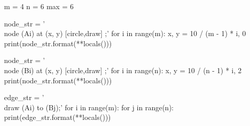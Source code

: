 \begin{python}
m = 4
n = 6
max = 6

node_str = '\\node (A{i}) at ({x}, {y}) [circle,draw] {{}};\n'
for i in range(m):
    x, y = 10 / (m -  1) * i, 0
    print(node_str.format(**locals()))

node_str = '\\node (B{i}) at ({x}, {y}) [circle,draw] {{}};\n'
for i in range(n):
    x, y = 10 / (n - 1) * i, 2
    print(node_str.format(**locals()))

edge_str = '\\draw (A{i}) to (B{j});\n'
for i in range(m):
    for j in range(n):
        print(edge_str.format(**locals()))

\end{python}

